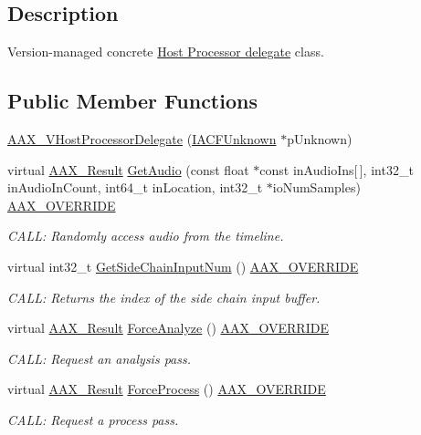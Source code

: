 \subsection{Description}
Version-\/managed concrete \hyperlink{a00102}{Host Processor delegate} class. \subsection*{Public Member Functions}
\begin{DoxyCompactItemize}
\item 
\hyperlink{a00136_ab50f9b08bc0d0ab6696ad3081aa790d8}{A\+A\+X\+\_\+\+V\+Host\+Processor\+Delegate} (\hyperlink{a00146}{I\+A\+C\+F\+Unknown} $\ast$p\+Unknown)
\item 
virtual \hyperlink{a00149_a4d8f69a697df7f70c3a8e9b8ee130d2f}{A\+A\+X\+\_\+\+Result} \hyperlink{a00136_adb4efec40af7c59ad8d72ca8b1b22c21}{Get\+Audio} (const float $\ast$const in\+Audio\+Ins\mbox{[}$\,$\mbox{]}, int32\+\_\+t in\+Audio\+In\+Count, int64\+\_\+t in\+Location, int32\+\_\+t $\ast$io\+Num\+Samples) \hyperlink{a00149_ac2f24a5172689ae684344abdcce55463}{A\+A\+X\+\_\+\+O\+V\+E\+R\+R\+I\+D\+E}
\begin{DoxyCompactList}\small\item\em C\+A\+L\+L\+: Randomly access audio from the timeline. \end{DoxyCompactList}\item 
virtual int32\+\_\+t \hyperlink{a00136_a32fd80e495c6a1e17b1d5c9fb65e2ca8}{Get\+Side\+Chain\+Input\+Num} () \hyperlink{a00149_ac2f24a5172689ae684344abdcce55463}{A\+A\+X\+\_\+\+O\+V\+E\+R\+R\+I\+D\+E}
\begin{DoxyCompactList}\small\item\em C\+A\+L\+L\+: Returns the index of the side chain input buffer. \end{DoxyCompactList}\item 
virtual \hyperlink{a00149_a4d8f69a697df7f70c3a8e9b8ee130d2f}{A\+A\+X\+\_\+\+Result} \hyperlink{a00136_a26244bf564e4fc1b6409b116887d8187}{Force\+Analyze} () \hyperlink{a00149_ac2f24a5172689ae684344abdcce55463}{A\+A\+X\+\_\+\+O\+V\+E\+R\+R\+I\+D\+E}
\begin{DoxyCompactList}\small\item\em C\+A\+L\+L\+: Request an analysis pass. \end{DoxyCompactList}\item 
virtual \hyperlink{a00149_a4d8f69a697df7f70c3a8e9b8ee130d2f}{A\+A\+X\+\_\+\+Result} \hyperlink{a00136_af998824a65953916b06a9abbe8696e34}{Force\+Process} () \hyperlink{a00149_ac2f24a5172689ae684344abdcce55463}{A\+A\+X\+\_\+\+O\+V\+E\+R\+R\+I\+D\+E}
\begin{DoxyCompactList}\small\item\em C\+A\+L\+L\+: Request a process pass. \end{DoxyCompactList}\end{DoxyCompactItemize}


